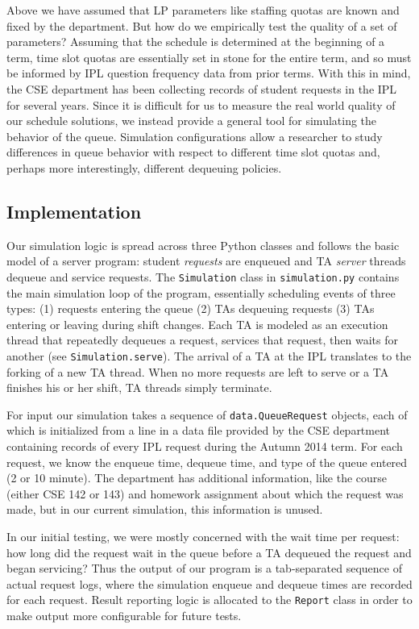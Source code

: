 \documentclass{article}
\begin{document}
\begin{multicols}{2}
Above we have assumed that LP parameters like staffing quotas are known and fixed by the department. But how do we empirically test the quality of a set of parameters? Assuming that the schedule is determined at the beginning of a term, time slot quotas are essentially set in stone for the entire term, and so must be informed by IPL question frequency data from prior terms. With this in mind, the CSE department has been collecting records of student requests in the IPL for several years. Since it is difficult for us to measure the real world quality of our schedule solutions, we instead provide a general tool for simulating the behavior of the queue. Simulation configurations allow a researcher to study differences in queue behavior with respect to different time slot quotas and, perhaps more interestingly, different dequeuing policies.

\subsection*{Implementation}

Our simulation logic is spread across three Python classes and follows the basic model of a server program: student \textit{requests} are enqueued and TA \textit{server} threads dequeue and service requests. The \texttt{Simulation} class in \texttt{simulation.py} contains the main simulation loop of the program, essentially scheduling events of three types: (1) requests entering the queue (2) TAs dequeuing requests (3) TAs entering or leaving during shift changes. Each TA is modeled as an execution thread that repeatedly dequeues a request, services that request, then waits for another (see \texttt{Simulation.serve}). The arrival of a TA at the IPL translates to the forking of a new TA thread. When no more requests are left to serve or a TA finishes his or her shift, TA threads simply terminate.

For input our simulation takes a sequence of \texttt{data.QueueRequest} objects, each of which is initialized from a line in a data file provided by the CSE department containing records of every IPL request during the Autumn 2014 term. For each request, we know the enqueue time, dequeue time, and type of the queue entered (2 or 10 minute). The department has additional information, like the course (either CSE 142 or 143) and homework assignment about which the request was made, but in our current simulation, this information is unused.

In our initial testing, we were mostly concerned with the wait time per request: how long did the request wait in the queue before a TA dequeued the request and began servicing? Thus the output of our program is a tab-separated sequence of actual request logs, where the simulation enqueue and dequeue times are recorded for each request. Result reporting logic is allocated to the \texttt{Report} class in order to make output more configurable for future tests.


\end{multicols}
\end{document}

